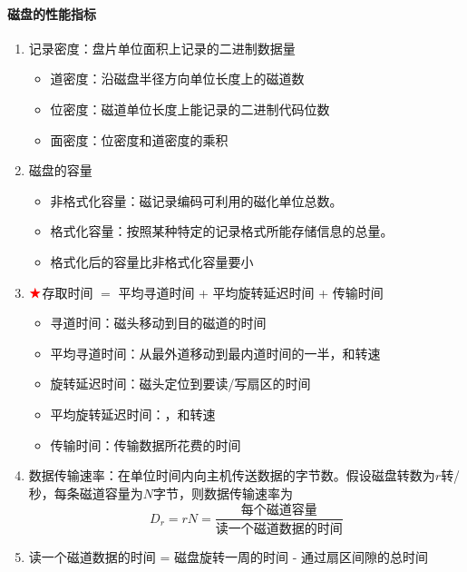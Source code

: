 \documentclass[a4paper,12pt]{article}
\begin{document}
    \paragraph{磁盘的性能指标}
    \begin{enumerate}
        \item 记录密度：盘片单位面积上记录的二进制数据量
        \begin{itemize}
            \item 道密度：沿磁盘半径方向单位长度上的磁道数
            \item 位密度：磁道单位长度上能记录的二进制代码位数
            \item 面密度：位密度和道密度的乘积
        \end{itemize}
        \item 磁盘的容量
        \begin{itemize}
            \item 非格式化容量：磁记录编码可利用的磁化单位总数。{\color{customgreen}{非格式化容量 = 记录面数 $\times$ 柱面数 $\times$ 每条磁道的磁化单位数}}
            \item 格式化容量：按照某种特定的记录格式所能存储信息的总量。{\color{customgreen}{格式化容量 = 记录面数 $\times$ 柱面数 $\times$ 每道扇区数 $\times$ 每个扇区的容量}}
            \item 格式化后的容量比非格式化容量要小
        \end{itemize}
        \item $\color{red}{\bigstar}$存取时间 $=$ 平均寻道时间 + 平均旋转延迟时间 + 传输时间
        \begin{itemize}
            \item 寻道时间：磁头移动到目的磁道的时间
            \item 平均寻道时间：从最外道移动到最内道时间的一半，和转速{\color{red}{无关}}
            \item 旋转延迟时间：磁头定位到要读/写扇区的时间
            \item 平均旋转延迟时间：{\color{red}{旋转半周的时间}}，和转速{\color{customgreen}{有关}}
            \item 传输时间：传输数据所花费的时间
        \end{itemize}
        \item 数据传输速率：在单位时间内向主机传送数据的字节数。假设磁盘转数为$r$转/秒，每条磁道容量为$N$字节，则数据传输速率为
        \[
            D_r = rN = \dfrac{\text{每个磁道容量}}{\text{读一个磁道数据的时间}}
        \]
        \item 读一个磁道数据的时间 = 磁盘旋转一周的时间 - 通过扇区间隙的总时间
    \end{enumerate}
\end{document}
